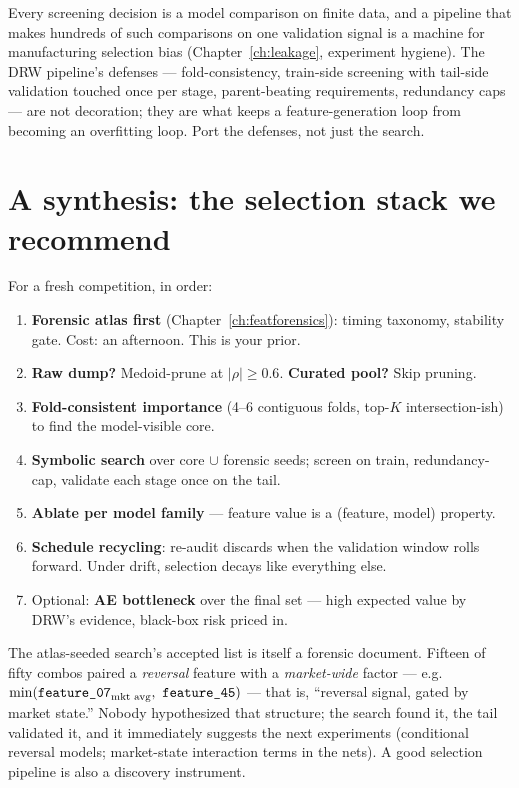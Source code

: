 \begin{warnbox}
Every screening decision is a model comparison on finite data, and a
pipeline that makes hundreds of such comparisons on one validation signal
is a machine for manufacturing selection bias
(Chapter~\ref{ch:leakage}, experiment hygiene). The DRW pipeline's
defenses --- fold-consistency, train-side screening with tail-side
validation touched once per stage, parent-beating requirements,
redundancy caps --- are not decoration; they are what keeps a
feature-generation loop from becoming an overfitting loop. Port the
defenses, not just the search.
\end{warnbox}

\section{A synthesis: the selection stack we recommend}

For a fresh competition, in order:

\begin{enumerate}
\item \textbf{Forensic atlas first} (Chapter~\ref{ch:featforensics}):
  timing taxonomy, stability gate. Cost: an afternoon. This is your prior.
\item \textbf{Raw dump?} Medoid-prune at $|\rho| \ge 0.6$.
  \textbf{Curated pool?} Skip pruning.
\item \textbf{Fold-consistent importance} (4--6 contiguous folds, top-$K$
  intersection-ish) to find the model-visible core.
\item \textbf{Symbolic search} over core $\cup$ forensic seeds; screen on
  train, redundancy-cap, validate each stage once on the tail.
\item \textbf{Ablate per model family} --- feature value is a
  (feature, model) property.
\item \textbf{Schedule recycling}: re-audit discards when the validation
  window rolls forward. Under drift, selection decays like everything
  else.
\item Optional: \textbf{AE bottleneck} over the final set --- high
  expected value by DRW's evidence, black-box risk priced in.
\end{enumerate}

\begin{jsbox}
The atlas-seeded search's accepted list is itself a forensic document.
Fifteen of fifty combos paired a \emph{reversal} feature with a
\emph{market-wide} factor --- e.g.\
$\min(\feat{07}_{\text{mkt avg}},\ \feat{45})$ --- that is, ``reversal
signal, gated by market state.'' Nobody hypothesized that structure; the
search found it, the tail validated it, and it immediately suggests the
next experiments (conditional reversal models; market-state interaction
terms in the nets). A good selection pipeline is also a discovery
instrument.
\end{jsbox}

